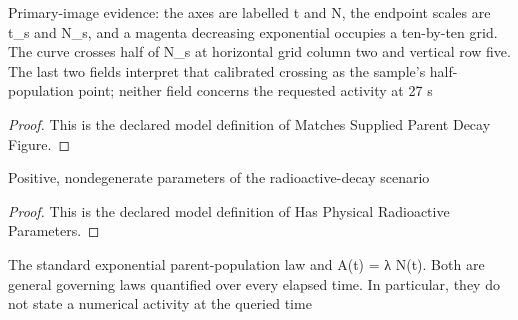 \begin{definition}
  \label{def:physics:phyx-mini-0576:phyxminiproblems-problemphyxmini0576-matchessuppliedparentdecayfigure}
  Primary-image evidence: the axes are labelled t and N, the endpoint scales are t\_s and N\_s, and a magenta decreasing exponential occupies a ten-by-ten grid. The curve crosses half of N\_s at horizontal grid column two and vertical row five. The last two fields interpret that calibrated crossing as the sample's half-population point; neither field concerns the requested activity at 27 s
\end{definition}
\begin{proof}
  This is the declared model definition of Matches Supplied Parent Decay Figure.
\end{proof}
\begin{definition}
  \label{def:physics:phyx-mini-0576:phyxminiproblems-problemphyxmini0576-hasphysicalradioactiveparameters}
  Positive, nondegenerate parameters of the radioactive-decay scenario
\end{definition}
\begin{proof}
  This is the declared model definition of Has Physical Radioactive Parameters.
\end{proof}
\begin{definition}
  \label{def:physics:phyx-mini-0576:phyxminiproblems-problemphyxmini0576-satisfiesradioactivedecaylaws}
  The standard exponential parent-population law and A(t) = λ N(t). Both are general governing laws quantified over every elapsed time. In particular, they do not state a numerical activity at the queried time
\end{definition}
